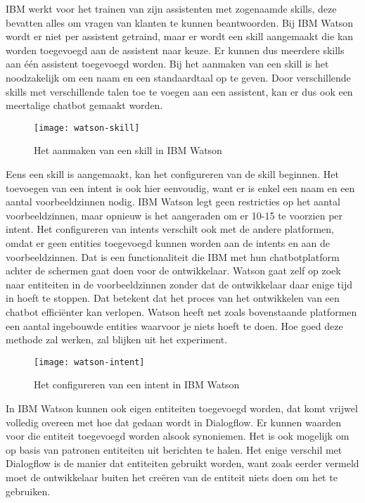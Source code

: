 IBM werkt voor het trainen van zijn assistenten met zogenaamde skills, deze bevatten alles om vragen van klanten te kunnen beantwoorden. Bij IBM Watson wordt er niet per assistent getraind, maar er wordt een skill aangemaakt die kan worden toegevoegd aan de assistent naar keuze. Er kunnen dus meerdere skills aan één assistent toegevoegd worden. Bij het aanmaken van een skill is het noodzakelijk om een naam en een standaardtaal op te geven. Door verschillende skills met verschillende talen toe te voegen aan een assistent, kan er dus ook een meertalige chatbot gemaakt worden.

\begin{figure}[H]
    \label{fig:watson-skill}
    \centering
    \texttt{[image: watson-skill]}
    \caption{Het aanmaken van een skill in IBM Watson}
\end{figure}

Eens een skill is aangemaakt, kan het configureren van de skill beginnen. Het toevoegen van een intent is ook hier eenvoudig, want er is enkel een naam en een aantal voorbeeldzinnen nodig. IBM Watson legt geen restricties op het aantal voorbeeldzinnen, maar opnieuw is het aangeraden om er 10-15 te voorzien per intent. Het configureren van intents verschilt ook met de andere platformen, omdat er geen entities toegevoegd kunnen worden aan de intents en aan de voorbeeldzinnen. Dat is een functionaliteit die IBM met hun chatbotplatform achter de schermen gaat doen voor de ontwikkelaar. Watson gaat zelf op zoek naar entiteiten in de voorbeeldzinnen zonder dat de ontwikkelaar daar enige tijd in hoeft te stoppen. Dat betekent dat het proces van het ontwikkelen van een chatbot efficiënter kan verlopen. Watson heeft net zoals bovenstaande platformen een aantal ingebouwde entities waarvoor je niets hoeft te doen. Hoe goed deze methode zal werken, zal blijken uit het experiment.

\begin{figure}[H]
    \label{fig:watson-intent}
    \centering
    \texttt{[image: watson-intent]}
    \caption{Het configureren van een intent in IBM Watson}
\end{figure}

In IBM Watson kunnen ook eigen entiteiten toegevoegd worden, dat komt vrijwel volledig overeen met hoe dat gedaan wordt in Dialogflow. Er kunnen waarden voor die entiteit toegevoegd worden alsook synoniemen. Het is ook mogelijk om op basis van patronen entiteiten uit berichten te halen. Het enige verschil met Dialogflow is de manier dat entiteiten gebruikt worden, want zoals eerder vermeld moet de ontwikkelaar buiten het creëren van de entiteit niets doen om het te gebruiken.

